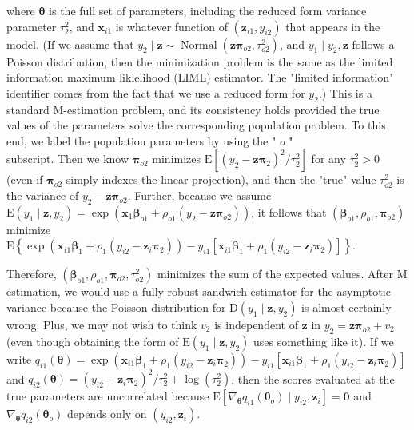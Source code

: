 \documentclass[10pt]{article}
\begin{document}
where $\boldsymbol{\theta}$ is the full set of parameters, including the reduced form variance parameter $\tau_{2}^{2}$, and $\mathbf{x}_{i 1}$ is whatever function of $\left(\mathbf{z}_{i 1}, y_{i 2}\right)$ that appears in the model. (If we assume that $y_{2} \mid \mathbf{z} \sim \operatorname{Normal}\left(\mathbf{z} \boldsymbol{\pi}_{o 2}, \tau_{o 2}^{2}\right)$, and $y_{1} \mid y_{2}, \mathbf{z}$ follows a Poisson distribution, then the minimization problem is the same as the limited information maximum liklelihood (LIML) estimator. The "limited information" identifier comes from the fact that we use a reduced form for $y_{2}$.) This is a standard M-estimation problem, and its consistency holds provided the true values of the parameters solve the corresponding population problem. To this end, we label the population parameters by using the " $o$ "\\
subscript. Then we know $\boldsymbol{\pi}_{o 2}$ minimizes $\mathrm{E}\left[\left(y_{2}-\mathbf{z} \boldsymbol{\pi}_{2}\right)^{2} / \tau_{2}^{2}\right]$ for any $\tau_{2}^{2}>0$ (even if $\boldsymbol{\pi}_{o 2}$ simply indexes the linear projection), and then the "true" value $\tau_{o 2}^{2}$ is the variance of $y_{2}-\mathbf{z} \boldsymbol{\pi}_{o 2}$. Further, because we assume $\mathrm{E}\left(y_{1} \mid \mathbf{z}, y_{2}\right)=\exp \left(\mathbf{x}_{1} \boldsymbol{\beta}_{o 1}+\rho_{o 1}\left(y_{2}-\mathbf{z} \boldsymbol{\pi}_{o 2}\right)\right)$, it follows that $\left(\boldsymbol{\beta}_{o 1}, \rho_{o 1}, \boldsymbol{\pi}_{o 2}\right)$ minimize\\
$\mathrm{E}\left\{\exp \left(\mathbf{x}_{i 1} \boldsymbol{\beta}_{1}+\rho_{1}\left(y_{i 2}-\mathbf{z}_{i} \boldsymbol{\pi}_{2}\right)\right)-y_{i 1}\left[\mathbf{x}_{i 1} \boldsymbol{\beta}_{1}+\rho_{1}\left(y_{i 2}-\mathbf{z}_{i} \boldsymbol{\pi}_{2}\right)\right]\right\}$.

Therefore, $\left(\boldsymbol{\beta}_{o 1}, \rho_{o 1}, \boldsymbol{\pi}_{o 2}, \tau_{o 2}^{2}\right)$ minimizes the sum of the expected values. After M estimation, we would use a fully robust sandwich estimator for the asymptotic variance because the Poisson distribution for $\mathrm{D}\left(y_{1} \mid \mathbf{z}, y_{2}\right)$ is almost certainly wrong. Plus, we may not wish to think $v_{2}$ is independent of $\mathbf{z}$ in $y_{2}=\mathbf{z} \boldsymbol{\pi}_{o 2}+v_{2}$ (even though obtaining the form of $\mathrm{E}\left(y_{1} \mid \mathbf{z}, y_{2}\right)$ uses something like it). If we write $q_{i 1}(\boldsymbol{\theta})= \exp \left(\mathbf{x}_{i 1} \boldsymbol{\beta}_{1}+\rho_{1}\left(y_{i 2}-\mathbf{z}_{i} \boldsymbol{\pi}_{2}\right)\right)-y_{i 1}\left[\mathbf{x}_{i 1} \boldsymbol{\beta}_{1}+\rho_{1}\left(y_{i 2}-\mathbf{z}_{i} \boldsymbol{\pi}_{2}\right)\right]$ and $q_{i 2}(\boldsymbol{\theta})=\left(y_{i 2}-\mathbf{z}_{i} \boldsymbol{\pi}_{2}\right)^{2} / \tau_{2}^{2} +\log \left(\tau_{2}^{2}\right)$, then the scores evaluated at the true parameters are uncorrelated because $\mathrm{E}\left[\nabla_{\boldsymbol{\theta}} q_{i 1}\left(\boldsymbol{\theta}_{o}\right) \mid y_{i 2}, \mathbf{z}_{i}\right]=\mathbf{0}$ and $\nabla_{\boldsymbol{\theta}} q_{i 2}\left(\boldsymbol{\theta}_{o}\right)$ depends only on $\left(y_{i 2}, \mathbf{z}_{i}\right)$.
\end{document}

